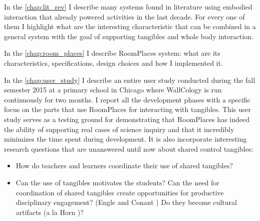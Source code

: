 In the \autoref{chap:lit_rev} I describe many systems found in literature using embodied interaction that already powered activities in the last decade. For every one of them I highlight what are the interesting characteristic that can be combined in a general system with the goal of supporting tangibles and whole body interaction.

In the \autoref{chap:room_places} I describe RoomPlaces system: what are its characteristics, specifications, design choices and how I implemented it.

In the \autoref{chap:user_study} I describe an entire user study conducted during the fall semester 2015 at a primary school in Chicago where WallCology is run continuously for two months. I report all the development phases with a specific focus on the parts that use RoomPlaces for interacting with tangibles. This user study serves as a testing ground for demonstrating that RoomPlaces has indeed the ability of supporting real cases of science inquiry and that it incredibly minimizes the time spent during development. It is also incorporate interesting research questions that are unanswered until now about shared control tangibles: 

\begin{itemize}
\item How do teachers and learners coordinate their use of shared tangibles?
\item Can the use of tangibles motivates the students? Can the need for coordination of shared tangibles create opportunities for productive disciplinary engagement? (Engle and Conant \cite{engle:guiding}) Do they become cultural artifacts (a la Horn \cite{horn:role})?
\end{itemize}
